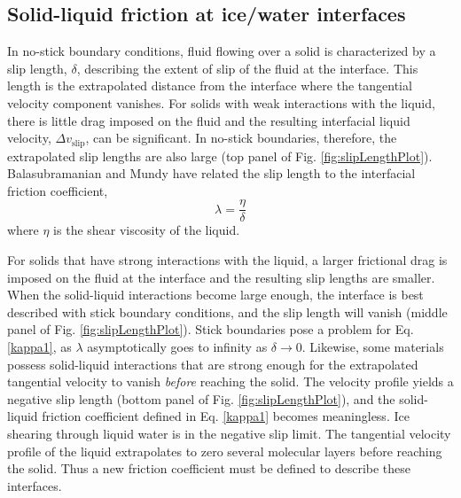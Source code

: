 \documentclass[journal = jpccck, manuscript = article]{achemso}
\begin{document}
\subsection{Solid-liquid friction at ice/water interfaces}
In no-stick boundary conditions, fluid flowing over a solid is
characterized by a slip length, $\delta$, describing the extent of
slip of the fluid at the interface. This length is the extrapolated
distance from the interface where the tangential velocity component
vanishes. For solids with weak interactions with the liquid, there is
little drag imposed on the fluid and the resulting interfacial liquid
velocity, $\Delta v_\mathrm{slip}$, can be significant. In no-stick
boundaries, therefore, the extrapolated slip lengths are also large
(top panel of Fig. \ref{fig:slipLengthPlot}).  Balasubramanian and
Mundy have related the slip length to the interfacial friction
coefficient, 
\begin{equation}\label{kappa1}
\lambda = \frac{\eta}{\delta}
\end{equation}
where $\eta$ is the shear viscosity of the
liquid.\cite{Balasubramanian1999}

For solids that have strong interactions with the liquid, a larger
frictional drag is imposed on the fluid at the interface and the
resulting slip lengths are smaller. When the solid-liquid interactions
become large enough, the interface is best described with stick
boundary conditions, and the slip length will vanish (middle panel of
Fig. \ref{fig:slipLengthPlot}).  Stick boundaries pose a problem for
Eq.  \eqref{kappa1}, as $\lambda$ asymptotically goes to infinity as
$\delta \rightarrow 0$.  Likewise, some materials possess solid-liquid
interactions that are strong enough for the extrapolated tangential
velocity to vanish \textit{before} reaching the solid. The velocity
profile yields a negative slip length (bottom panel of Fig.
\ref{fig:slipLengthPlot}), and the solid-liquid friction coefficient
defined in Eq. \eqref{kappa1} becomes meaningless.  Ice shearing
through liquid water is in the negative slip limit. The tangential
velocity profile of the liquid extrapolates to zero several molecular
layers before reaching the solid. Thus a new friction coefficient must
be defined to describe these interfaces.
\end{document}
